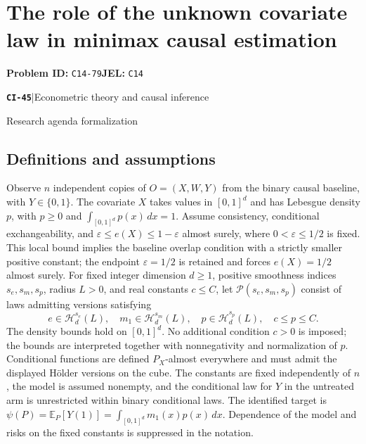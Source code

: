 \documentclass[11pt,a4paper]{article}
\newcommand{\E}{\mathbb E}
\newcommand{\entrymeta}[3]{{\sffamily\small\color{muted}\textbf{\texttt{#1}}\quad|\quad #2\par #3\par}}
\begin{document}
\section*{The role of the unknown covariate law in minimax causal estimation}
\textbf{Problem ID:} \texttt{C14-79}\quad \textbf{JEL:} \texttt{C14}\par
\label{problem:OP-0524}
\label{beyond:CI-45}
\entrymeta{CI-45}{Econometric theory and causal inference}{Research agenda formalization}
\subsection*{Definitions and assumptions}
Observe $n$ independent copies of $O=(X,W,Y)$ from the binary causal baseline, with $Y\in\{0,1\}$. The covariate $X$ takes values in $[0,1]^d$ and has Lebesgue density $p$, with $p\geq0$ and $\int_{[0,1]^d}p(x)\,dx=1$. Assume consistency, conditional exchangeability, and $\varepsilon\leq e(X)\leq1-\varepsilon$ almost surely, where $0<\varepsilon\leq1/2$ is fixed. This local bound implies the baseline overlap condition with a strictly smaller positive constant; the endpoint $\varepsilon=1/2$ is retained and forces $e(X)=1/2$ almost surely. For fixed integer dimension $d\geq1$, positive smoothness indices $s_e,s_m,s_p$, radius $L>0$, and real constants $c\leq C$, let $\mathcal P(s_e,s_m,s_p)$ consist of laws admitting versions satisfying
\[
 e\in\mathcal H_d^{s_e}(L),\quad
 m_1\in\mathcal H_d^{s_m}(L),\quad
 p\in\mathcal H_d^{s_p}(L),\quad c\leq p\leq C.
\]
The density bounds hold on $[0,1]^d$. No additional condition $c>0$ is imposed; the bounds are interpreted together with nonnegativity and normalization of $p$. Conditional functions are defined $P_X$-almost everywhere and must admit the displayed H\"older versions on the cube. The constants are fixed independently of $n$, the model is assumed nonempty, and the conditional law for $Y$ in the untreated arm is unrestricted within binary conditional laws. The identified target is $\psi(P)=\E_P[Y(1)]=\int_{[0,1]^d}m_1(x)p(x)\,dx$. Dependence of the model and risks on the fixed constants is suppressed in the notation.
\end{document}
